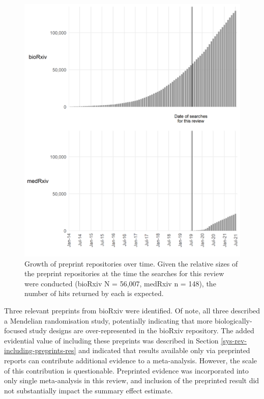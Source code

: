 \documentclass[a4paper, twoside]{templates/ociamthesis}
\begin{document}
\begin{figure}[H]

{\centering \includegraphics[width=0.8\linewidth]{figures/sys-rev/preprint_growth} 

}

\caption[Growth of preprint repositories over time]{Growth of preprint repositories over time. Given the relative sizes of the preprint repositories at the time the searches for this review were conducted (bioRxiv N = 56,007, medRxiv n = 148), the number of hits returned by each is expected.}\label{fig:preprintGrowth}
\end{figure}

Three relevant preprints from bioRxiv were identified. Of note, all three described a Mendelian randomisation study, potentially indicating that more biologically-focused study designs are over-represented in the bioRxiv repository. The added evidential value of including these preprints was described in Section \ref{sys-rev-including-preprints-res} and indicated that results available only via preprinted reports can contribute additional evidence to a meta-analysis. However, the scale of this contribution is questionable. Preprinted evidence was incorporated into only single meta-analysis in this review, and inclusion of the preprinted result did not substantially impact the summary effect estimate.
\end{document}
